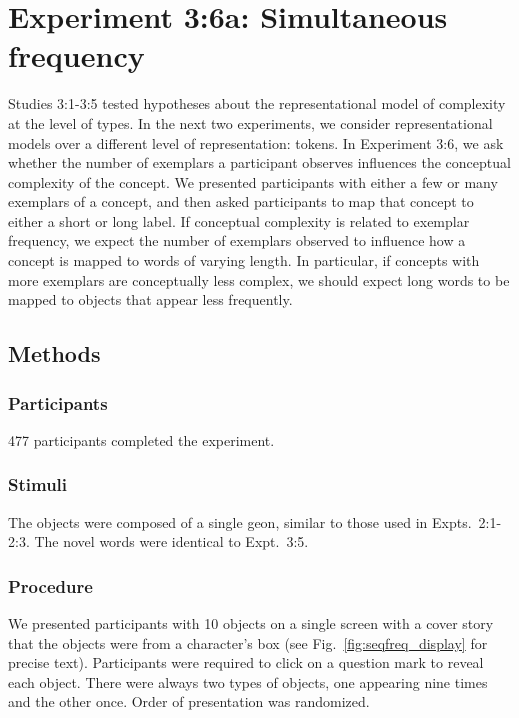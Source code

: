 \section{Experiment 3:6a: Simultaneous frequency}
Studies 3:1-3:5  tested hypotheses about the representational model of complexity at the level of types. In the next two experiments, we  consider representational models over a different level of representation: tokens. In Experiment 3:6, we ask whether the number of exemplars a participant observes influences the conceptual complexity of the concept. We presented participants with either a few or many exemplars of a concept, and then asked participants to map that concept to either a short or long label. If conceptual complexity is related to exemplar frequency, we expect the number of exemplars observed to influence how a concept is mapped to words of varying length. In particular, if concepts with more exemplars are conceptually less complex, we should expect long words to be mapped to objects that appear less frequently.

\subsection{Methods}
\subsubsection{Participants}
477 participants completed the experiment.
\subsubsection{Stimuli}
The objects were composed of a single geon, similar to those used in Expts.\ 2:1-2:3. The novel words were identical to Expt.\ 3:5.
\subsubsection{Procedure}
We presented participants with 10 objects on a single screen with a cover story that the objects were from a character's box (see Fig.\ \ref{fig:seqfreq_display} for precise text). Participants were required to click on a question mark to reveal each object. There were always two types of objects, one appearing nine times and the other once. Order of presentation was randomized.

